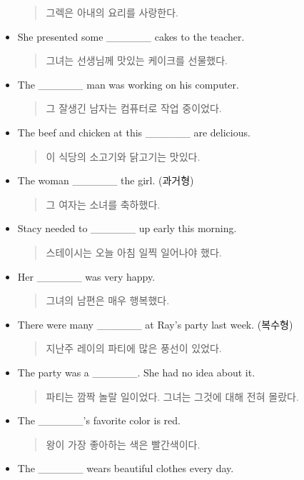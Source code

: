 \documentclass{article}
\begin{document}
\begin{addmargin}[1em]{1em}
\begin{itemize}
    \begin{quote}
    그렉은 아내의 요리를 사랑한다.
    \end{quote}
    \item She presented some \_\_\_\_\_\_ cakes to the teacher.
    \begin{quote}
    그녀는 선생님께 맛있는 케이크를 선물했다.
    \end{quote}
    \item The \_\_\_\_\_\_ man was working on his computer.
    \begin{quote}
    그 잘생긴 남자는 컴퓨터로 작업 중이었다.
    \end{quote}
    \item The beef and chicken at this \_\_\_\_\_\_ are delicious.
    \begin{quote}
    이 식당의 소고기와 닭고기는 맛있다.
    \end{quote}
    \newpage
    \item The woman \_\_\_\_\_\_ the girl. (과거형)
    \begin{quote}
    그 여자는 소녀를 축하했다.
    \end{quote}
    \item Stacy needed to \_\_\_\_\_\_ up early this morning.
    \begin{quote}
    스테이시는 오늘 아침 일찍 일어나야 했다.
    \end{quote}
    \item Her \_\_\_\_\_\_ was very happy.
    \begin{quote}
    그녀의 남편은 매우 행복했다.
    \end{quote}
    \item There were many \_\_\_\_\_\_ at Ray's party last week. (복수형)
    \begin{quote}
    지난주 레이의 파티에 많은 풍선이 있었다.
    \end{quote}
    \item The party was a \_\_\_\_\_\_. She had no idea about it.
    \begin{quote}
    파티는 깜짝 놀랄 일이었다. 그녀는 그것에 대해 전혀 몰랐다.
    \end{quote}
    \item The \_\_\_\_\_\_'s favorite color is red.
    \begin{quote}
    왕이 가장 좋아하는 색은 빨간색이다.
    \end{quote}
    \item The \_\_\_\_\_\_ wears beautiful clothes every day.
    \begin{quote}

\end{quote}
\end{itemize}
\end{addmargin}
\end{document}
